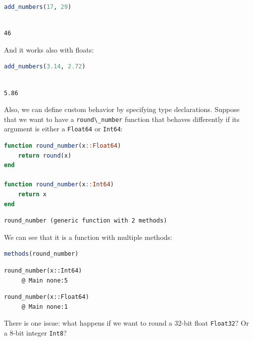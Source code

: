 \documentclass[
  notoc %
]{tufte-book}
\newcommand{\passthrough}[1]{#1}
\begin{document}
\begin{lstlisting}[language=Julia]
add_numbers(17, 29)
\end{lstlisting}

\begin{lstlisting}[language=Output]

46

\end{lstlisting}

And it works also with floats:

\begin{lstlisting}[language=Julia]
add_numbers(3.14, 2.72)
\end{lstlisting}

\begin{lstlisting}[language=Output]

5.86

\end{lstlisting}

Also, we can define custom behavior by specifying type declarations.
Suppose that we want to have a \passthrough{\lstinline!round\_number!}
function that behaves differently if its argument is either a
\passthrough{\lstinline!Float64!} or \passthrough{\lstinline!Int64!}:

\begin{lstlisting}[language=Julia]
function round_number(x::Float64)
    return round(x)
end

function round_number(x::Int64)
    return x
end
\end{lstlisting}

\begin{lstlisting}[language=Output]
round_number (generic function with 2 methods)
\end{lstlisting}

We can see that it is a function with multiple methods:

\begin{lstlisting}[language=Julia]
methods(round_number)
\end{lstlisting}

\begin{lstlisting}[language=Output]
round_number(x::Int64)
     @ Main none:5
\end{lstlisting}

\begin{lstlisting}[language=Output]
round_number(x::Float64)
     @ Main none:1
\end{lstlisting}

There is one issue: what happens if we want to round a 32-bit float
\passthrough{\lstinline!Float32!}? Or a 8-bit integer
\passthrough{\lstinline!Int8!}?
\end{document}
